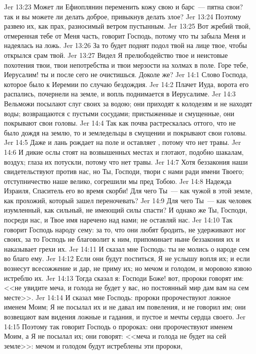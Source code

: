 \vs Jer 13:23 Может ли Ефиоплянин переменить кожу свою и барс~--- пятна свои? так и вы можете ли делать доброе, привыкнув делать злое?
\vs Jer 13:24 Поэтому развею их, как прах, разносимый ветром пустынным.
\vs Jer 13:25 Вот жребий твой, отмеренная тебе от Меня часть, говорит Господь, потому что ты забыла Меня и надеялась на ложь.
\vs Jer 13:26 За то будет поднят подол твой на лице твое, чтобы открылся срам твой.
\vs Jer 13:27 Видел Я прелюбодейство твое и неистовые похотения твои, твои непотребства и твои мерзости на холмах в поле. Горе тебе, Иерусалим! ты и после сего не очистишься. Доколе же?
\vs Jer 14:1 Слово Господа, которое было к Иеремии по случаю бездождия.
\vs Jer 14:2 Плачет Иуда, ворота его распались, почернели на земле, и вопль поднимается в Иерусалиме.
\vs Jer 14:3 Вельможи посылают слуг своих за водою; они приходят к колодезям и не находят воды; возвращаются с пустыми сосудами; пристыженные и смущенные, они покрывают свои головы.
\vs Jer 14:4 Так как почва растрескалась оттого, что не было дождя на землю, то и земледельцы в смущении и покрывают свои головы.
\vs Jer 14:5 Даже и лань рождает на поле и оставляет , потому что нет травы.
\vs Jer 14:6 И дикие ослы стоят на возвышенных местах и глотают, подобно шакалам, воздух; глаза их потускли, потому что нет травы.
\vs Jer 14:7 Хотя беззакония наши свидетельствуют против нас, но Ты, Господи, твори с нами ради имени Твоего; отступничество наше велико, согрешили мы пред Тобою.
\vs Jer 14:8 Надежда Израиля, Спаситель его во время скорби! Для чего Ты~--- как чужой в этой земле, как прохожий, который зашел переночевать?
\vs Jer 14:9 Для чего Ты~--- как человек изумленный, как сильный, не имеющий силы спасти? И однако же Ты, Господи, посреди нас, и Твое имя наречено над нами; не оставляй нас.
\vs Jer 14:10 Так говорит Господь народу сему: за то, что они любят бродить, не удерживают ног своих, за то Господь не благоволит к ним, припоминает ныне беззакония их и наказывает грехи их.
\rsbpar\vs Jer 14:11 И сказал мне Господь: ты не молись о народе сем во благо ему.
\vs Jer 14:12 Если они будут поститься, Я не услышу вопля их; и если вознесут всесожжение и дар, не приму их; но мечом и голодом, и моровою язвою истреблю их.
\vs Jer 14:13 Тогда сказал я: Господи Боже! вот, пророки говорят им: <<не увидите меча, и голода не будет у вас, но постоянный мир дам вам на сем месте>>.
\vs Jer 14:14 И сказал мне Господь: пророки пророчествуют ложное именем Моим; Я не посылал их и не давал им повеления, и не говорил им; они возвещают вам видения ложные и гадания, и пустое и мечты сердца своего.
\vs Jer 14:15 Поэтому так говорит Господь о пророках: они пророчествуют именем Моим, а Я не посылал их; они говорят: <<меча и голода не будет на сей земле>>: мечом и голодом будут истреблены эти пророки,
